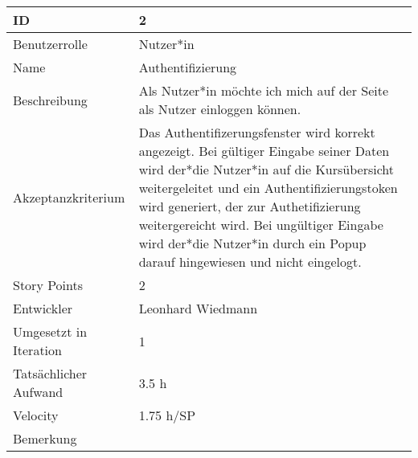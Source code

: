 \begin{tabularx}{\textwidth}{|p{}|X|}
	\hline
	ID & 2\\
	\hline
	Benutzerrolle & Nutzer*in\\
	\hline
	Name & Authentifizierung\\
	\hline
	Beschreibung & Als Nutzer*in möchte ich mich auf der Seite als Nutzer einloggen können.\\
	\hline
	Akzeptanzkriterium & Das Authentifizerungsfenster wird korrekt angezeigt. Bei gültiger Eingabe seiner Daten wird der*die Nutzer*in auf die Kursübersicht weitergeleitet und ein Authentifizierungstoken wird generiert, der zur Authetifizierung weitergereicht wird. Bei ungültiger Eingabe wird der*die Nutzer*in durch ein Popup darauf hingewiesen und nicht eingelogt.\\
	\hline
	Story Points & 2 \\
	\hline
	Entwickler & Leonhard Wiedmann\\
	\hline
	Umgesetzt in Iteration & 1\\
	\hline
	Tatsächlicher Aufwand & 3.5 h\\
	\hline
	Velocity & 1.75 h/SP\\
	\hline
	Bemerkung & \\
	\hline
\end{tabularx}
\vspace{20pt}
